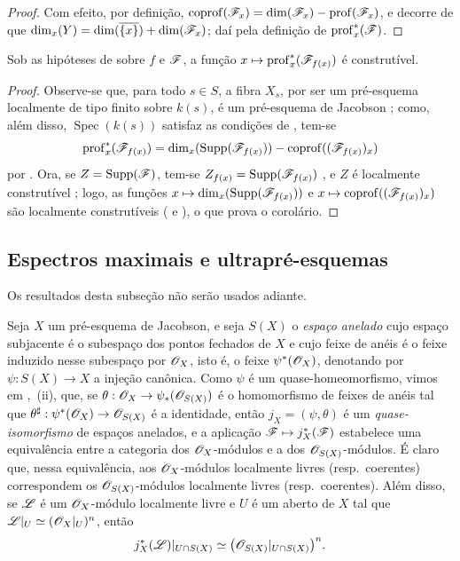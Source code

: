 \begin{proof}
Com efeito, por definição, $\operatorname{coprof}(\mathscr{F}_x)=\dim(\mathscr{F}_x)-\operatorname{prof}(\mathscr{F}_x)$, e decorre de  que $\dim_x(Y)=\dim(\overline{\{x\}})+\dim(\mathscr{F}_x)$; daí  pela definição de $\operatorname{prof}^{*}_{x}(\mathscr{F})$.
\end{proof}

\begin{corollary}[10.8.8]
\label{IV.10.8.8}
Sob as hipóteses de  sobre $f$ e $\mathscr{F}$, a função $x\mapsto\operatorname{prof}^{*}_{x}(\sh{F}_{f(x)})$ é construtível.
\end{corollary}

\begin{proof}
Observe-se que, para todo $s\in S$, a fibra $X_s$, por ser um pré-esquema localmente de tipo finito sobre $k(s)$, é um pré-esquema de Jacobson ; como, além disso, $\operatorname{Spec}(k(s))$ satisfaz as condições de , tem-se
\[
  \operatorname{prof}^{*}_{x}(\mathscr{F}_{f(x)})
  =\dim_x(\operatorname{Supp}(\mathscr{F}_{f(x)}))
   -\operatorname{coprof}((\mathscr{F}_{f(x)})_x)
\]
por .
Ora, se $Z=\operatorname{Supp}(\mathscr{F})$, tem-se $Z_{f(x)}=\operatorname{Supp}(\mathscr{F}_{f(x)})$ , e $Z$ é localmente construtível ; logo, as funções $x\mapsto\dim_x(\operatorname{Supp}(\sh{F}_{f(x)}))$ e $x\mapsto\operatorname{coprof}((\sh{F}_{f(x)})_x)$ são localmente construtíveis ( e ), o que prova o corolário.
\end{proof}

\subsection{Espectros maximais e ultrapré-esquemas}
\label{subsection:IV.10.9}

Os resultados desta subseção não serão usados adiante.

\begin{env}[10.9.1]
\label{IV.10.9.1}
Seja $X$ um pré-esquema de Jacobson, e seja $S(X)$ o \emph{espaço anelado} cujo espaço subjacente é o subespaço dos pontos fechados de $X$ e cujo feixe de anéis é o feixe induzido nesse subespaço por $\mathscr{O}_X$, isto é, o feixe $\psi^*(\mathscr{O}_X)$, denotando por $\psi:S(X)\to X$ a injeção canônica.
Como $\psi$ é um
quase-homeomorfismo, vimos em ,~(ii), que, se $\theta:\sh{O}_X\to\psi_*(\sh{O}_{S(X)})$ é o homomorfismo de feixes de anéis tal que $\theta^\sharp:\psi^*(\sh{O}_X)\to\sh{O}_{S(X)}$ é a identidade, então $j_X=(\psi,\theta)$ é um \emph{quase-isomorfismo} de espaços anelados, e a aplicação $\sh{F}\mapsto j_X^*(\sh{F})$ estabelece uma equivalência entre a categoria dos $\mathscr{O}_X$-módulos e a dos $\mathscr{O}_{S(X)}$-módulos.
É claro que, nessa equivalência, aos $\mathscr{O}_X$-módulos localmente livres (resp.\ coerentes) correspondem os $\mathscr{O}_{S(X)}$-módulos localmente livres (resp.\ coerentes).
Além disso, se $\mathscr{L}$ é um $\mathscr{O}_X$-módulo localmente livre e $U$ é um aberto de $X$ tal que $\mathscr{L}|_U\simeq(\mathscr{O}_X|_U)^n$, então
\[
  j_X^*(\mathscr{L})|_{U\cap S(X)}
  \simeq \bigl(\mathscr{O}_{S(X)}|_{U\cap S(X)}\bigr)^n.
\]
\end{env}

